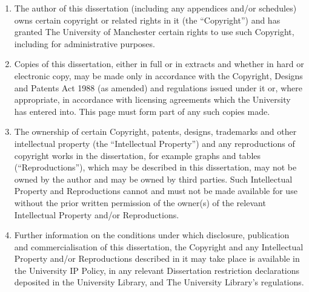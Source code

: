 \begin{enumerate}[label=\roman*.]
    \item The author of this dissertation (including any appendices and/or schedules) owns certain copyright or related rights in it (the “Copyright”) and has granted The University of Manchester certain rights to use such Copyright, including for administrative purposes.

    \item Copies of this dissertation, either in full or in extracts and whether in hard or electronic copy, may be made only in accordance with the Copyright, Designs and Patents Act 1988 (as amended) and regulations issued under it or, where appropriate, in accordance with licensing agreements which the University has entered into. This page must form part of any such copies made.

    \item The ownership of certain Copyright, patents, designs, trademarks and other intellectual property (the “Intellectual Property”) and any reproductions of copyright works in the dissertation, for example graphs and tables (“Reproductions”), which may be described in this dissertation, may not be owned by the author and may be owned by third parties. Such Intellectual Property and Reproductions cannot and must not be made available for use without the prior written permission of the owner(s) of the relevant Intellectual Property and/or Reproductions.

    \item Further information on the conditions under which disclosure, publication and commercialisation of this dissertation, the Copyright and any Intellectual Property and/or Reproductions described in it may take place is available in the University IP Policy, in any relevant Dissertation restriction declarations deposited in the University Library, and The University Library’s regulations.
\end{enumerate}